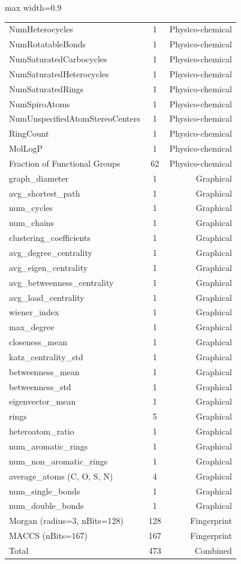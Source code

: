 \documentclass[sigconf,authordraft]{acmart}
\begin{document}
\begin{table}[!ht]
\begin{adjustbox}{max width=0.9\linewidth}
\begin{tabular}{|l|c|r|}
NumHeterocycles & 1 & Physico-chemical \\
NumRotatableBonds & 1 & Physico-chemical \\
NumSaturatedCarbocycles & 1 & Physico-chemical \\
NumSaturatedHeterocycles & 1 & Physico-chemical \\
NumSaturatedRings & 1 & Physico-chemical \\
NumSpiroAtoms & 1 & Physico-chemical \\
NumUnspecifiedAtomStereoCenters & 1 & Physico-chemical \\
RingCount & 1 & Physico-chemical \\
MolLogP & 1 & Physico-chemical \\
Fraction of Functional Groups & 62 & Physico-chemical \\
graph\_diameter & 1 & Graphical \\
avg\_shortest\_path & 1 & Graphical \\
num\_cycles & 1 & Graphical \\
num\_chains & 1 & Graphical \\
clustering\_coefficients & 1 & Graphical \\
avg\_degree\_centrality & 1 & Graphical \\
avg\_eigen\_centrality & 1 & Graphical \\
avg\_betweenness\_centrality & 1 & Graphical \\
avg\_load\_centrality & 1 & Graphical \\
wiener\_index & 1 & Graphical \\
max\_degree & 1 & Graphical \\
closeness\_mean & 1 & Graphical \\
katz\_centrality\_std & 1 & Graphical \\
betweenness\_mean & 1 & Graphical \\
betweenness\_std & 1 & Graphical \\
eigenvector\_mean & 1 & Graphical \\
rings & 5 & Graphical \\
heteroatom\_ratio & 1 & Graphical \\
num\_aromatic\_rings & 1 & Graphical \\
num\_non\_aromatic\_rings & 1 & Graphical \\
average\_atoms (C, O, S, N) & 4 & Graphical \\
num\_single\_bonds & 1 & Graphical \\
num\_double\_bonds & 1 & Graphical \\
Morgan (radius=3, nBits=128) & 128 & Fingerprint \\
MACCS (nBits=167) & 167 & Fingerprint \\ \hline
Total & 473 & Combined \\
\bottomrule
\end{tabular}
\end{adjustbox}
\end{table}
\end{document}
